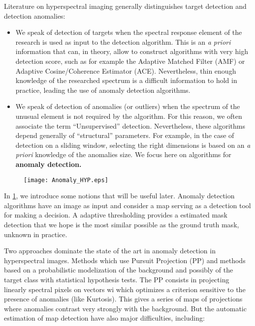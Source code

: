 Literature on hyperspectral imaging
generally distinguishes target detection and detection
anomalies:

\begin{itemize}
\item {We speak of detection of targets when the spectral response
element of the research is used as input to
the detection algorithm. This is an \textit{a priori} information that
can, in theory, allow to construct algorithms with very high
detection score, such as for example the Adaptive Matched Filter (AMF) or Adaptive
Cosine/Coherence Estimator (ACE). Nevertheless,
thin enough knowledge of the researched spectrum is a difficult 
information to hold in practice, leading the use of anomaly detection algorithms.}

\item {We speak of detection of anomalies (or outliers) when the spectrum
  of the unusual element is not required by the algorithm. For this reason, we often associate the term
  ``Unsupervised'' detection. Nevertheless, these algorithms depend
  generally of ``structural'' parameters. For example, in the case
  of detection on a sliding window, selecting the right
  dimensions is based on an \textit{a priori} knowledge of the anomalies size. 
  We focus here on algorithms for \bf{anomaly detection}.}

\end{itemize}
    
\begin{figure}[h]
  \centering
  \texttt{[image: Anomaly\_HYP.eps]}
  \label{fig:anomaly_hyp}
\end{figure}

In \ref{fig:anomaly_hyp}, we introduce some notions that will be useful later. Anomaly detection algorithms have an image as input and consider a map
serving as a detection tool for making a decision. A
adaptive thresholding provides a estimated mask detection that
we hope is the most similar possible as the ground truth mask,
unknown in practice.

Two approaches dominate the state of the art in anomaly detection
in hyperspectral images. Methods which use Pursuit
Projection (PP) and methods based on a probabilistic modelization of the background and possibly of the target class
with statistical hypothesis tests.
The PP consists in projecting linearly spectral pixels on
vectors wi which optimizes a criterion sensitive to the presence of anomalies
(like Kurtosis). This gives a series of maps of projections
where anomalies contrast very strongly with the background. But the automatic estimation of map  detection have also major difficulties, including:

